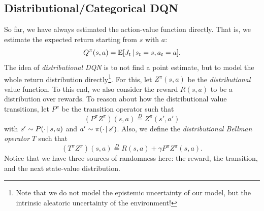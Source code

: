 		\subsection{Distributional/Categorical \acs{DQN}}
			So far, we have always estimated the action-value function directly. That is, we estimate the expected return starting from \(s\) with \(a\):
			\begin{equation}
				Q^\pi(s, a) = \mathbb{E}[J_t \,\vert\, s_t = s, a_t = a].
			\end{equation}
			The idea of \emph{distributional \ac{DQN}} is to not find a point estimate, but to model the whole return distribution directly\footnote{Note that we do not model the epistemic uncertainty of our model, but the intrinsic aleatoric uncertainty of the environment!}. For this, let \(Z^\pi(s, a)\) be the \emph{distributional} value function. To this end, we also consider the reward \(R(s, a)\) to be a distribution over rewards. To reason about how the distributional value transitions, let \( P^\pi \) be the transition operator such that
			\begin{equation}
				(P^\pi Z^\pi)(s, a) \overset{D}{=} Z^\pi(s', a')
			\end{equation}
			with \( s' \sim P(\cdot \,\vert\, s, a) \) and \( a' \sim \pi(\cdot \,\vert\, s') \). Also, we define the \emph{distributional Bellman operator} \( T \) such that
			\begin{equation}
				(T^\pi Z^\pi)(s, a) \overset{D}{=} R(s, a) + \gamma P^\pi Z^\pi(s, a).  \label{eq:distDqnBellman}
			\end{equation}
			Notice that we have three sources of randomness here: the reward, the transition, and the next state-value distribution.

